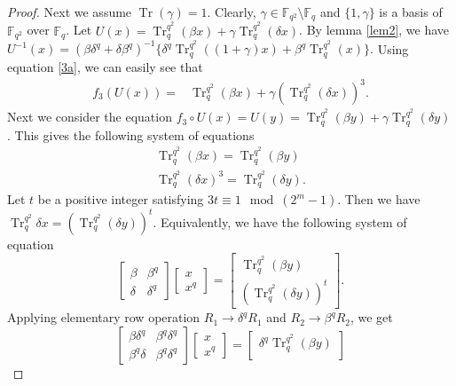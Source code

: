 \documentclass[10pt,a4paper]{amsart}
\begin{document}
\begin{proof}
	Next we assume $\operatorname{Tr}(\gamma)=1$. Clearly, $\gamma\in \mathbb{F}_{q^2}\setminus\mathbb{F}_q$ and 
	$\{1,\gamma\}$ is a basis of $\mathbb{F}_{q^2}$ over $\mathbb{F}_{q}$.
	Let $U(x)=\operatorname{Tr}_q^{q^2}{(\beta x)}+\gamma\operatorname{Tr}_q^{q^2}(\delta x)$. By lemma \ref{lem2}, we have
	$U^{-1}(x)=(\beta\delta^{q}+\delta\beta^{q})^{-1}\{\delta^{q}\operatorname{Tr}_{q}^{q^2}((1+\gamma)x)+\beta^{q}\operatorname{Tr}_{q}^{q^2}(x)\}.$
	Using equation \ref{3a}, we can easily see that
  \begin{align}
  	f_3(U(x))
  	=&\operatorname{Tr}_q^{q^2}(\beta x)+\gamma(\operatorname{Tr}_q^{q^2}(\delta x))^3.\label{3f}
  \end{align}
	Next we consider the equation $f_3\circ U(x)=U(y)=\operatorname{Tr}_{q}^{q^2}(\beta y)+\gamma\operatorname{Tr}_{q}^{q^2}(\delta y)$. This gives the following system of equations	
	\begin{align*}
		\operatorname{Tr}_q^{q^2}(\beta x)=\operatorname{Tr}_q^{q^2}(\beta y)\\
		\operatorname{Tr}_q^{q^2}(\delta x)^3=\operatorname{Tr}_q^{q^2}(\delta y).
	\end{align*}
	Let $t$ be a positive integer satisfying $3t\equiv 1\mod{(2^m-1)}$.
	Then we have $\operatorname{Tr}_q^{q^2}{\delta x}=(\operatorname{Tr}_q^{q^2}(\delta y))^t$. Equivalently, we have the following system of equation
	$$\begin{bmatrix}
		\beta&\beta^{q}\\
		\delta&\delta^{q}
	\end{bmatrix}
	\begin{bmatrix}
		x\\x^{q}
	\end{bmatrix}=
	\begin{bmatrix}
		\operatorname{Tr}_{q}^{q^2}(\beta y)\\
		(\operatorname{Tr}_{q}^{q^2}(\delta y))^t
	\end{bmatrix}.$$
	Applying elementary row operation $R_1\rightarrow\delta^{q}R_1$ and $R_2\rightarrow\beta^{q}R_2$, we get
	$$\begin{bmatrix}
		\beta\delta^{q}&\beta^{q}\delta^{q}\\
		\beta^{q}\delta&\beta^{q}\delta^{q}
	\end{bmatrix}
	\begin{bmatrix}
		x\\x^{q}
	\end{bmatrix}=
	\begin{bmatrix}
		\delta^{q}\operatorname{Tr}_{q}^{q^2}(\beta y)\\

\end{bmatrix}$$
\end{proof}
\end{document}
